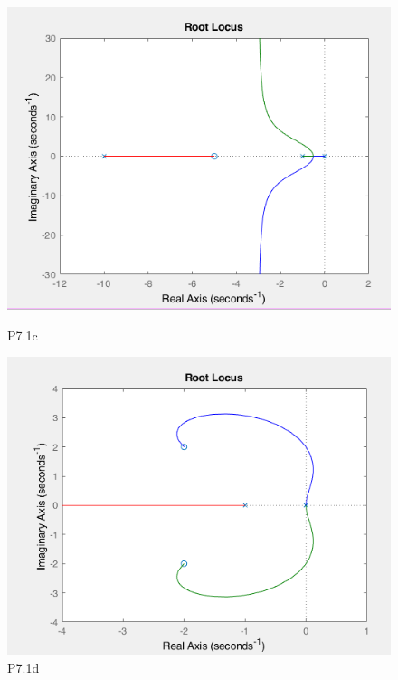 \documentclass{article}
\begin{document}
	\begin{center}
		
		\begin{figure}
			\centering
			\begin{minipage}{.5\textwidth}
				\centering
				\includegraphics[width=1.00\linewidth]{1c}
				\caption{P7.1c}
			\end{minipage}%
			\begin{minipage}{.5\textwidth}
				\centering
				\includegraphics[width=1.00\linewidth]{1d}
				\caption{P7.1d}
			\end{minipage}
		\end{figure}
		

\end{center}
\end{document}
